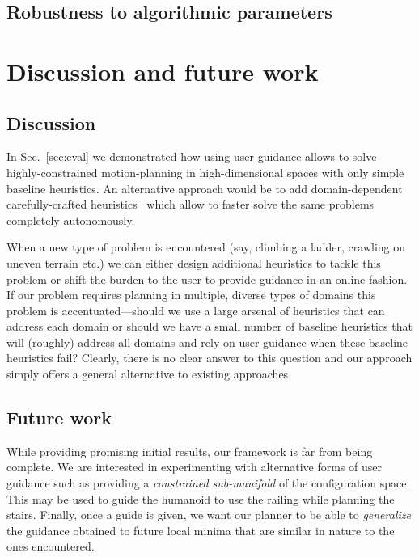 \documentclass[conference]{IEEEtran}
\begin{document}
\subsection{Robustness to algorithmic parameters}
\section{Discussion and future work}
\label{sec:future}

\subsection{Discussion}
In Sec.~\ref{sec:eval} we demonstrated how using user guidance allows to solve highly-constrained motion-planning in high-dimensional spaces with only simple baseline heuristics.
An alternative approach would be to add domain-dependent carefully-crafted heuristics~\cite{V17} which allow to faster solve the same problems completely autonomously.


When a new type of problem is encountered 
(say, climbing a ladder, crawling on uneven terrain etc.)
we can either design additional heuristics to tackle this problem or shift the burden to the user to provide guidance in an online fashion.
If our problem requires planning in multiple, diverse types of domains this problem is accentuated---should we  use a large arsenal of heuristics that can address each domain or should we have a small number of baseline heuristics that will (roughly) address all domains and rely on user guidance when these baseline heuristics fail?
Clearly, there is no clear answer to this question and our approach simply offers a general alternative to existing approaches.


\subsection{Future work}
While providing promising initial results, our framework is far from being complete.
We are interested in experimenting with alternative forms of user guidance such as providing a \emph{constrained sub-manifold} of the configuration space. This may be used to guide the humanoid to use the railing while planning the stairs.
Finally, once a guide is given, we want our planner to be able to \emph{generalize} the guidance obtained to future local minima that are similar in nature to the ones encountered.
\end{document}
